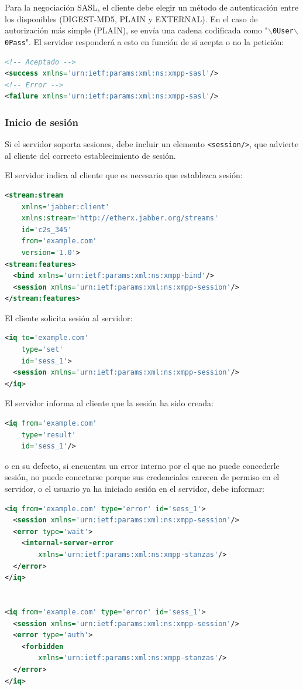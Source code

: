 \documentclass[a4paper, 11pt]{article} %
\begin{document}
    Para la negociación SASL, el cliente debe elegir un método de autenticación entre los disponibles
    (DIGEST-MD5, PLAIN y EXTERNAL). En el caso de autorización más simple (PLAIN), se envía una cadena
    codificada como "\texttt{$\backslash$0User$\backslash$0Pass}". El servidor responderá a esto en 
    función de si acepta o no la petición:
    \begin{lstlisting}[language=XML]
<!-- Aceptado -->
<success xmlns='urn:ietf:params:xml:ns:xmpp-sasl'/>
<!-- Error -->
<failure xmlns='urn:ietf:params:xml:ns:xmpp-sasl'/>
    \end{lstlisting}
    
  \subsubsection{Inicio de sesión}
    Si el servidor soporta sesiones, debe incluir un elemento \texttt{<session/>}, que advierte al cliente del 
    correcto establecimiento de sesión.
    
    El servidor indica al cliente que es necesario que establezca sesión:
\begin{lstlisting}[language=XML]
<stream:stream
    xmlns='jabber:client'
    xmlns:stream='http://etherx.jabber.org/streams'
    id='c2s_345'
    from='example.com'
    version='1.0'>
<stream:features>
  <bind xmlns='urn:ietf:params:xml:ns:xmpp-bind'/>
  <session xmlns='urn:ietf:params:xml:ns:xmpp-session'/>
</stream:features>
\end{lstlisting}

    El cliente solicita sesión al servidor:
\begin{lstlisting}[language=XML]
<iq to='example.com'
    type='set'
    id='sess_1'>
  <session xmlns='urn:ietf:params:xml:ns:xmpp-session'/>
</iq>
\end{lstlisting}

    El servidor informa al cliente que la sesión ha sido creada:
\begin{lstlisting}[language=XML]   
<iq from='example.com'
    type='result'
    id='sess_1'/>
\end{lstlisting}

    o en su defecto, si encuentra un error interno por el que no puede concederle sesión, no puede conectarse porque
    sus credenciales carecen de permiso en el servidor, o el usuario ya ha iniciado sesión en el servidor, debe informar:
\begin{lstlisting}[language=XML]
<iq from='example.com' type='error' id='sess_1'>
  <session xmlns='urn:ietf:params:xml:ns:xmpp-session'/>
  <error type='wait'>
    <internal-server-error
        xmlns='urn:ietf:params:xml:ns:xmpp-stanzas'/>
  </error>
</iq>


<iq from='example.com' type='error' id='sess_1'>
  <session xmlns='urn:ietf:params:xml:ns:xmpp-session'/>
  <error type='auth'>
    <forbidden
        xmlns='urn:ietf:params:xml:ns:xmpp-stanzas'/>
  </error>
</iq>
\end{lstlisting}
\end{document}
